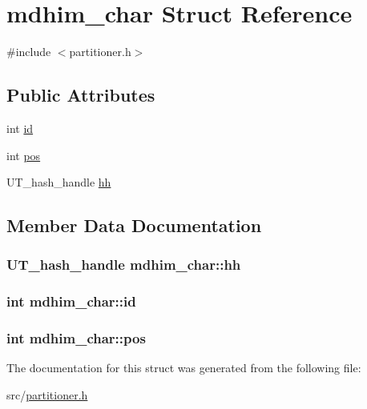 \hypertarget{structmdhim__char}{\section{mdhim\-\_\-char Struct Reference}
\label{structmdhim__char}
}


{\ttfamily \#include $<$partitioner.\-h$>$}

\subsection*{Public Attributes}
\begin{DoxyCompactItemize}
\item 
int \hyperlink{structmdhim__char_a61f3233391107b90ad4435ab7e23e0de}{id}
\item 
int \hyperlink{structmdhim__char_ace52abc0569a3c95cfadda1fce10b2aa}{pos}
\item 
U\-T\-\_\-hash\-\_\-handle \hyperlink{structmdhim__char_a78216045f803c2d64b46ea70661bf5f9}{hh}
\end{DoxyCompactItemize}


\subsection{Member Data Documentation}
\hypertarget{structmdhim__char_a78216045f803c2d64b46ea70661bf5f9}{
\subsubsection[{hh}]{\setlength{\rightskip}{0pt plus 5cm}U\-T\-\_\-hash\-\_\-handle mdhim\-\_\-char\-::hh}}\label{structmdhim__char_a78216045f803c2d64b46ea70661bf5f9}
\hypertarget{structmdhim__char_a61f3233391107b90ad4435ab7e23e0de}{
\subsubsection[{id}]{\setlength{\rightskip}{0pt plus 5cm}int mdhim\-\_\-char\-::id}}\label{structmdhim__char_a61f3233391107b90ad4435ab7e23e0de}
\hypertarget{structmdhim__char_ace52abc0569a3c95cfadda1fce10b2aa}{
\subsubsection[{pos}]{\setlength{\rightskip}{0pt plus 5cm}int mdhim\-\_\-char\-::pos}}\label{structmdhim__char_ace52abc0569a3c95cfadda1fce10b2aa}


The documentation for this struct was generated from the following file\-:\begin{DoxyCompactItemize}
\item 
src/\hyperlink{partitioner_8h}{partitioner.\-h}\end{DoxyCompactItemize}
